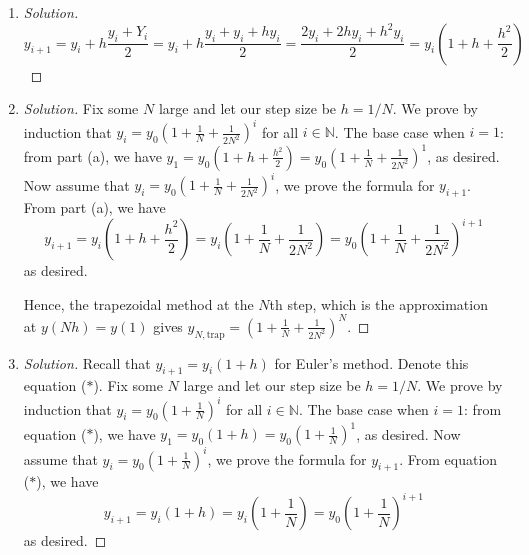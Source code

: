 \documentclass{article}
\newcommand{\N}{{\mathbb N}}
\begin{document}
\begin{enumerate}
	\item \begin{proof}[Solution]\let\qed\relax
		\[
			y_{i+1} = y_i + h\frac{y_i + Y_i}{2} =
			y_i + h\frac{y_i + y_i + hy_i}{2} =
			\frac{2y_i + 2hy_i + h^2y_i}{2}
			= y_i\left(1 + h + \frac{h^2}{2}\right)
		\]
	\end{proof}
	\item \begin{proof}[Solution]\let\qed\relax
		Fix some $N$ large and let our step size be $h = 1/N$.
		We prove by induction that $y_i = y_0(1+\frac{1}{N} + \frac{1}{2N^2})^i$
		for all $i \in \N$.
		The base case when $i = 1$:
		from part (a), we have
		$y_1 = y_0(1 + h + \frac{h^2}{2}) = y_0(1 + \frac{1}{N} + \frac{1}{2N^2})^1$, as desired.
		Now assume that $y_i = y_0(1+\frac{1}{N} + \frac{1}{2N^2})^i$,
		we prove the formula for $y_{i+1}$.
		From part (a), we have
		\[
			y_{i+1} = y_i(1 + h + \frac{h^2}{2}) =
			y_i(1 + \frac{1}{N} + \frac{1}{2N^2}) =
			y_0\left(1 + \frac{1}{N} + \frac{1}{2N^2}\right)^{i+1}
		\]
		as desired.

		Hence, the trapezoidal method at the $N$th step, which is the approximation at $y(Nh) = y(1)$
		gives $y_{N,\text{trap}} = (1 + \frac{1}{N} + \frac{1}{2N^2})^N$.
	\end{proof}
	\item \begin{proof}[Solution]\let\qed\relax
		Recall that $y_{i+1} = y_i(1+h)$ for Euler's method.
		Denote this equation ($*$).
		Fix some $N$ large and let our step size be $h = 1/N$.
		We prove by induction that $y_i = y_0(1+\frac{1}{N})^i$
		for all $i \in \N$.
		The base case when $i = 1$:
		from equation ($*$), we have
		$y_1 = y_0(1 + h) = y_0(1 + \frac{1}{N})^1$, as desired.
		Now assume that $y_i = y_0(1+\frac{1}{N})^i$,
		we prove the formula for $y_{i+1}$.
		From equation ($*$), we have
		\[
			y_{i+1} = y_i(1 + h) =
			y_i(1 + \frac{1}{N}) =
			y_0\left(1 + \frac{1}{N}\right)^{i+1}
		\]
		as desired.


\end{proof}
\end{enumerate}
\end{document}
